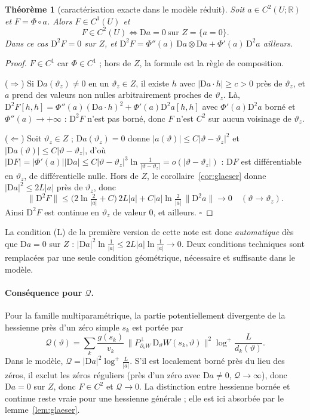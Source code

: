 \documentclass[11pt,a4paper]{article}
\newtheorem{theoreme}{Théorème}
\theoremstyle{remark}
\newcommand{\R}{\mathbb R}
\newcommand{\vth}{\vartheta}
\newcommand{\D}{\mathrm D}
\begin{document}
\begin{theoreme}[caractérisation exacte dans le modèle réduit]\label{thm:carac}
Soit $a\in C^2(U;\R)$ et $F=\Phi\circ a$. Alors $F\in C^1(U)$ et
\[
\boxed{\ F\in C^2(U)\iff\D a=0\ \text{sur }Z=\{a=0\}.\ }
\]
Dans ce cas $\D^2F=0$ sur $Z$, et $\D^2F=\Phi''(a)\,\D a\otimes\D a+\Phi'(a)\,\D^2a$ ailleurs.
\end{theoreme}
\begin{proof}
$F\in C^1$ car $\Phi\in C^1$ ; hors de $Z$, la formule est la règle de composition.

($\Rightarrow$) Si $\D a(\vth_z)\ne0$ en un $\vth_z\in Z$, il existe $h$ avec $\lvert\D a\cdot h\rvert\ge c>0$ près de $\vth_z$, et $a$ prend des valeurs non nulles arbitrairement proches de $\vth_z$. Là, $\D^2F[h,h]=\Phi''(a)(\D a\cdot h)^2+\Phi'(a)\D^2a[h,h]$ avec $\Phi'(a)\D^2a$ borné et $\Phi''(a)\to+\infty$ : $\D^2F$ n'est pas borné, donc $F$ n'est $C^2$ sur aucun voisinage de $\vth_z$.

($\Leftarrow$) Soit $\vth_z\in Z$ ; $\D a(\vth_z)=0$ donne $\lvert a(\vth)\rvert\le C\lvert\vth-\vth_z\rvert^2$ et $\lvert\D a(\vth)\rvert\le C\lvert\vth-\vth_z\rvert$, d'où $\lvert\D F\rvert=\lvert\Phi'(a)\rvert\lvert\D a\rvert\le C\lvert\vth-\vth_z\rvert^3\ln\frac1{\lvert\vth-\vth_z\rvert}=o(\lvert\vth-\vth_z\rvert)$ : $\D F$ est différentiable en $\vth_z$, de différentielle nulle. Hors de $Z$, le corollaire~\ref{cor:glaeser} donne $\lvert\D a\rvert^2\le2L\lvert a\rvert$ près de $\vth_z$, donc
\[
\lVert\D^2F\rVert\le\bigl(2\ln\tfrac2{\lvert a\rvert}+C\bigr)\,2L\lvert a\rvert+C\lvert a\rvert\ln\tfrac2{\lvert a\rvert}\,\lVert\D^2a\rVert\longrightarrow0\quad(\vth\to\vth_z).
\]
Ainsi $\D^2F$ est continue en $\vth_z$ de valeur $0$, et ailleurs. $\square$
\end{proof}

La condition (L) de la première version de cette note est donc \emph{automatique} dès que $\D a=0$ sur $Z$ : $\lvert\D a\rvert^2\ln\frac1{\lvert a\rvert}\le2L\lvert a\rvert\ln\frac1{\lvert a\rvert}\to0$. Deux conditions techniques sont remplacées par une seule condition géométrique, nécessaire et suffisante dans le modèle.

\paragraph{Conséquence pour $\mathcal Q$.} Pour la famille multiparamétrique, la partie potentiellement divergente de la hessienne près d'un zéro simple $s_k$ est portée par
\[
\mathcal Q(\vth)=\sum_k\frac{g(s_k)}{v_k}\,\bigl\lVert P^\perp_{\partial_sW}\,\D_\vth W(s_k,\vth)\bigr\rVert^2\log^+\frac L{d_k(\vth)} .
\]
Dans le modèle, $\mathcal Q=\lvert\D a\rvert^2\log^+\frac L{\lvert a\rvert}$. S'il est localement borné près du lieu des zéros, il exclut les zéros réguliers (près d'un zéro avec $\D a\ne0$, $\mathcal Q\to\infty$), donc $\D a=0$ sur $Z$, donc $F\in C^2$ et $\mathcal Q\to0$. La distinction entre hessienne bornée et continue reste vraie pour une hessienne générale ; elle est ici absorbée par le lemme~\ref{lem:glaeser}.
\end{document}
